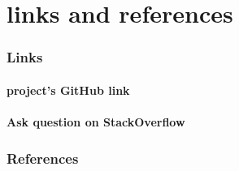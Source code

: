 \documentclass[12pt,a4paper]{article}
\begin{document}
	\part{links and references}\label{linkAndRef}
	
	\section{Links}\label{linkAndRef.links}
	\subsection*{project's GitHub link}
	\href{https://github.com/Matin0789/FinalFight.git}{\color{blue}{https://github.com/Matin0789/FinalFight.git}}
	\subsection*{Ask question on StackOverflow}
	\href{https://stackoverflow.com/questions/78060183/declare-array-in-structure-with-specified-size-in-c}{\color{blue}{https://stackoverflow.com/questions/78060183/declare-array-in-structure-with-specified-size-in-c}}
	
	\section{References}\label{linkAndRef.ref}
	 \href{https://www.geeksforgeeks.org/c-plus-plus/}{\color{blue}{https://www.geeksforgeeks.org/c-plus-plus/}}\\
	 \href{https://www.programiz.com/cpp-programming}{\color{blue}{https://www.programiz.com/cpp-programming}}
	 
\end{document}
